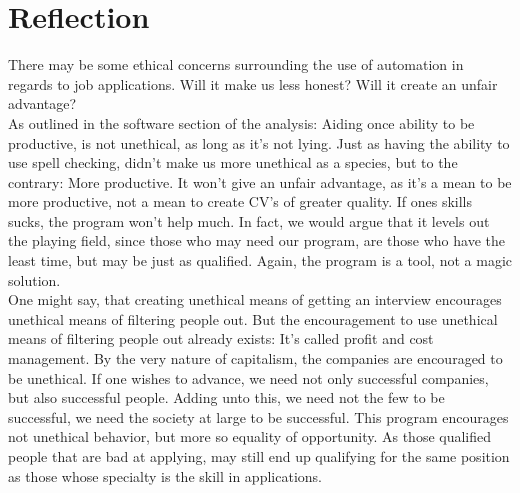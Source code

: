 \section{Reflection}
There may be some ethical concerns surrounding the use of automation in regards to job applications.
Will it make us less honest? Will it create an unfair advantage?\\
As outlined in the software section of the analysis: Aiding once ability to be productive, is not unethical, as long as it's not lying.
Just as having the ability to use spell checking, didn't make us more unethical as a species, but to the contrary: More productive.
It won't give an unfair advantage, as it's a mean to be more productive, not a mean to create CV's of greater quality. If ones skills sucks, the program won't help much.
In fact, we would argue that it levels out the playing field, since those who may need our program, are those who have the least time, but may be just as qualified. Again, the program is a tool, not a magic solution.\\

One might say, that creating unethical means of getting an interview encourages unethical means of filtering people out.
But the encouragement to use unethical means of filtering people out already exists:
It's called profit and cost management. By the very nature of capitalism, the companies are encouraged to be unethical.
If one wishes to advance, we need not only successful companies, but also successful people.
Adding unto this, we need not the few to be successful, we need the society at large to be successful. This program encourages not unethical behavior, but more so equality of opportunity.
As those qualified people that are bad at applying, may still end up qualifying for the same position as those whose specialty is the skill in applications.
\newpage